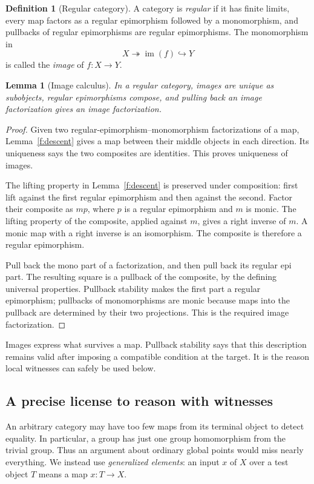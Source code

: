 \documentclass[11pt]{article}
\newtheorem{lemma}[theorem]{Lemma}
\theoremstyle{definition}
\newtheorem{definition}[theorem]{Definition}
\theoremstyle{remark}\newtheorem{remark}[theorem]{Remark}
\DeclareMathOperator{\im}{im}
\begin{document}
\begin{definition}[Regular category]\label{f:regular}
A category is \emph{regular} if it has finite limits, every map factors
as a regular epimorphism followed by a monomorphism, and pullbacks of
regular epimorphisms are regular epimorphisms. The monomorphism in
\[
X\twoheadrightarrow \im(f)\hookrightarrow Y
\]
is called the \emph{image} of $f:X\to Y$.
\end{definition}

\begin{lemma}[Image calculus]\label{f:images}
In a regular category, images are unique as subobjects, regular
epimorphisms compose, and pulling back an image factorization gives an
image factorization.
\end{lemma}
\begin{proof}
Given two regular-epimorphism--monomorphism factorizations of a map,
Lemma~\ref{f:descent} gives a map between their middle objects in each
direction. Its uniqueness says the two composites are identities.
This proves uniqueness of images.

The lifting property in Lemma~\ref{f:descent} is preserved under
composition: first lift against the first regular epimorphism and then
against the second. Factor their composite as $mp$, where $p$ is a
regular epimorphism and $m$ is monic. The lifting property of the
composite, applied against $m$, gives a right inverse of $m$. A monic
map with a right inverse is an isomorphism. The composite is therefore
a regular epimorphism.

Pull back the mono part of a factorization, and then pull back its
regular epi part. The resulting square is a pullback of the composite,
by the defining universal properties. Pullback stability makes the
first part a regular epimorphism; pullbacks of monomorphisms are monic
because maps into the pullback are determined by their two projections.
This is the required image factorization.
\end{proof}

Images express what survives a map. Pullback stability says that this
description remains valid after imposing a compatible condition at the
target. It is the reason local witnesses can safely be used below.

\subsection{A precise license to reason with witnesses}

An arbitrary category may have too few maps from its terminal object to
detect equality. In particular, a group has just one group homomorphism
from the trivial group. Thus an argument about ordinary global points
would miss nearly everything. We instead use \emph{generalized elements}:
an input $x$ of $X$ over a test object $T$ means a map $x:T\to X$.
\end{document}
